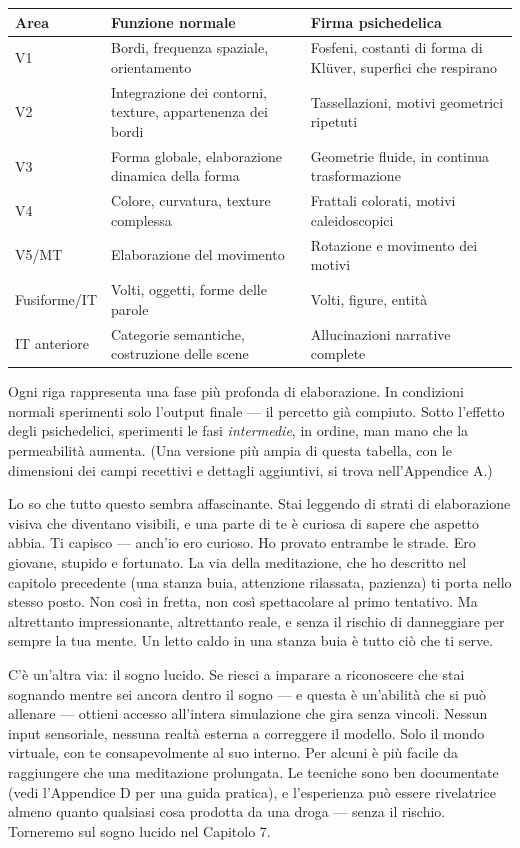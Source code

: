 \documentclass[11pt, twoside, openright]{book}
\begin{document}
\small
\begin{xltabular}{\linewidth}{X X X}
\toprule
\textbf{Area} & \textbf{Funzione normale} & \textbf{Firma psichedelica} \\
\midrule\endhead
V1 & Bordi, frequenza spaziale, orientamento & Fosfeni, costanti di forma di Klüver, superfici che respirano \\[4pt]
V2 & Integrazione dei contorni, texture, appartenenza dei bordi & Tassellazioni, motivi geometrici ripetuti \\[4pt]
V3 & Forma globale, elaborazione dinamica della forma & Geometrie fluide, in continua trasformazione \\[4pt]
V4 & Colore, curvatura, texture complessa & Frattali colorati, motivi caleidoscopici \\[4pt]
V5/\allowbreak{}MT & Elaborazione del movimento & Rotazione e movimento dei motivi \\[4pt]
Fusiforme/\allowbreak{}IT & Volti, oggetti, forme delle parole & Volti, figure, entità \\[4pt]
IT anteriore & Categorie semantiche, costruzione delle scene & Allucinazioni narrative complete \\[4pt]
\bottomrule
\end{xltabular}
\normalsize


Ogni riga rappresenta una fase più profonda di elaborazione. In condizioni normali sperimenti solo l'output finale --- il percetto già compiuto. Sotto l'effetto degli psichedelici, sperimenti le fasi \textit{intermedie}, in ordine, man mano che la permeabilità aumenta. (Una versione più ampia di questa tabella, con le dimensioni dei campi recettivi e dettagli aggiuntivi, si trova nell'Appendice A.)

Lo so che tutto questo sembra affascinante. Stai leggendo di strati di elaborazione visiva che diventano visibili, e una parte di te è curiosa di sapere che aspetto abbia. Ti capisco --- anch'io ero curioso. Ho provato entrambe le strade. Ero giovane, stupido e fortunato. La via della meditazione, che ho descritto nel capitolo precedente (una stanza buia, attenzione rilassata, pazienza) ti porta nello stesso posto. Non così in fretta, non così spettacolare al primo tentativo. Ma altrettanto impressionante, altrettanto reale, e senza il rischio di danneggiare per sempre la tua mente. Un letto caldo in una stanza buia è tutto ciò che ti serve.

C'è un'altra via: il sogno lucido. Se riesci a imparare a riconoscere che stai sognando mentre sei ancora dentro il sogno --- e questa è un'abilità che si può allenare --- ottieni accesso all'intera simulazione che gira senza vincoli. Nessun input sensoriale, nessuna realtà esterna a correggere il modello. Solo il mondo virtuale, con te consapevolmente al suo interno. Per alcuni è più facile da raggiungere che una meditazione prolungata. Le tecniche sono ben documentate (vedi l'Appendice D per una guida pratica), e l'esperienza può essere rivelatrice almeno quanto qualsiasi cosa prodotta da una droga --- senza il rischio. Torneremo sul sogno lucido nel Capitolo 7.
\end{document}
